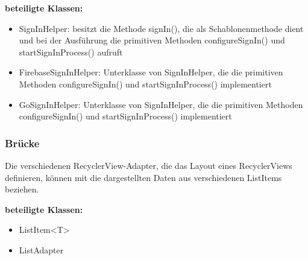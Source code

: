 \documentclass[11pt,a4paper]{report}
\begin{document}
\textbf{beteiligte Klassen:}
\begin{itemize}
	\item SignInHelper: besitzt die Methode signIn(), die als Schablonenmethode dient und bei der Ausführung die primitiven Methoden configureSignIn() und startSignInProcess() aufruft
	\item FirebaseSignInHelper: Unterklasse von SignInHelper, die die primitiven Methoden configureSignIn() und startSignInProcess() implementiert
	\item GoSignInHelper: Unterklasse von SignInHelper, die die primitiven Methoden configureSignIn() und startSignInProcess() implementiert
\end{itemize}

\subsubsection{Brücke}
Die verschiedenen RecyclerView-Adapter, die das Layout eines RecyclerViews definieren, können mit die dargestellten Daten aus verschiedenen ListItems beziehen.

\textbf{beteiligte Klassen:}
\begin{itemize}
	\item ListItem<T>
	\item ListAdapter
\end{itemize}
\end{document}
